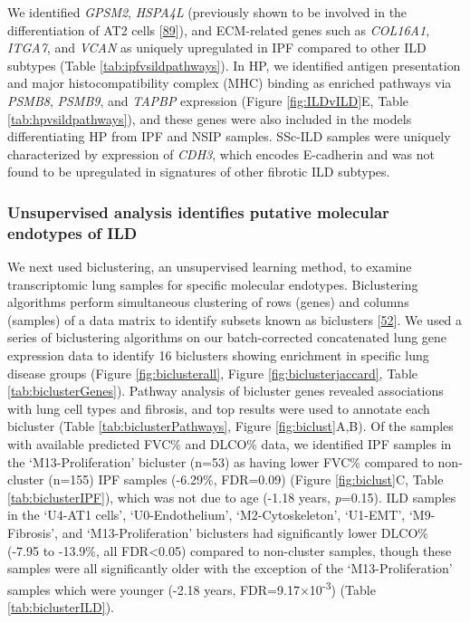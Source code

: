 \documentclass[
]{article}
\begin{document}
We identified \textit{GPSM2}, \textit{HSPA4L} (previously shown to be involved in the differentiation of AT2 cells {[}\protect\hyperlink{ref-mohamed_respiratory_2014}{89}{]}), and ECM-related genes such as \textit{COL16A1}, \textit{ITGA7}, and \textit{VCAN} as uniquely upregulated in IPF compared to other ILD subtypes (Table \ref{tab:ipfvsildpathways}). In HP, we identified antigen presentation and major histocompatibility complex (MHC) binding as enriched pathways via \textit{PSMB8}, \textit{PSMB9}, and \textit{TAPBP} expression (Figure \ref{fig:ILDvILD}E, Table \ref{tab:hpvsildpathways}), and these genes were also included in the models differentiating HP from IPF and NSIP samples. SSc-ILD samples were uniquely characterized by expression of \textit{CDH3}, which encodes E-cadherin and was not found to be upregulated in signatures of other fibrotic ILD subtypes.

\hypertarget{unsupervised-analysis-identifies-putative-molecular-endotypes-of-ild}{%
\subsubsection{Unsupervised analysis identifies putative molecular endotypes of ILD}\label{unsupervised-analysis-identifies-putative-molecular-endotypes-of-ild}}

We next used biclustering, an unsupervised learning method, to examine transcriptomic lung samples for specific molecular endotypes. Biclustering algorithms perform simultaneous clustering of rows (genes) and columns (samples) of a data matrix to identify subsets known as biclusters {[}\protect\hyperlink{ref-rose_mosbi_2022}{52}{]}. We used a series of biclustering algorithms on our batch-corrected concatenated lung gene expression data to identify 16 biclusters showing enrichment in specific lung disease groups (Figure \ref{fig:biclusterall}, Figure \ref{fig:biclusterjaccard}, Table \ref{tab:biclusterGenes}). Pathway analysis of bicluster genes revealed associations with lung cell types and fibrosis, and top results were used to annotate each bicluster (Table \ref{tab:biclusterPathways}, Figure \ref{fig:biclust}A,B). Of the samples with available predicted FVC\% and DLCO\% data, we identified IPF samples in the `M13-Proliferation' bicluster (n=53) as having lower FVC\% compared to non-cluster (n=155) IPF samples (-6.29\%, FDR=0.09) (Figure \ref{fig:biclust}C, Table \ref{tab:biclusterIPF}), which was not due to age (-1.18 years, \textit{p}=0.15). ILD samples in the `U4-AT1 cells', `U0-Endothelium', `M2-Cytoskeleton', `U1-EMT', `M9-Fibrosis', and `M13-Proliferation' biclusters had significantly lower DLCO\% (-7.95 to -13.9\%, all FDR\textless0.05) compared to non-cluster samples, though these samples were all significantly older with the exception of the `M13-Proliferation' samples which were younger (-2.18 years, FDR=9.17×10\textsuperscript{-3}) (Table \ref{tab:biclusterILD}).
\end{document}
